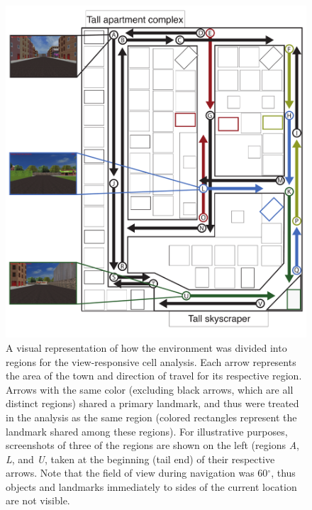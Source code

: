  \begin{figure}
\centering
  \includegraphics[width=.7\textheight]{./tex/dboy/figs/viewSmall}
  \caption[View-responsive cell analysis method]{A visual representation of how the environment was divided into regions for the view-responsive cell analysis. Each arrow represents the area of the town and direction of travel for its respective region. Arrows with the same color (excluding black arrows, which are all distinct regions) shared a primary landmark, and thus were treated in the analysis as the same region (colored rectangles represent the landmark shared among these regions). For illustrative purposes, screenshots of three of the regions are shown on the left (regions \emph{A}, \emph{L}, and \emph{U}, taken at the beginning (tail end) of their respective arrows. Note that the field of view during navigation was 60$^\circ$, thus objects and landmarks immediately to sides of the current location are not visible.}
\label{fig:view_methods}
\end{figure}

\clearpage
